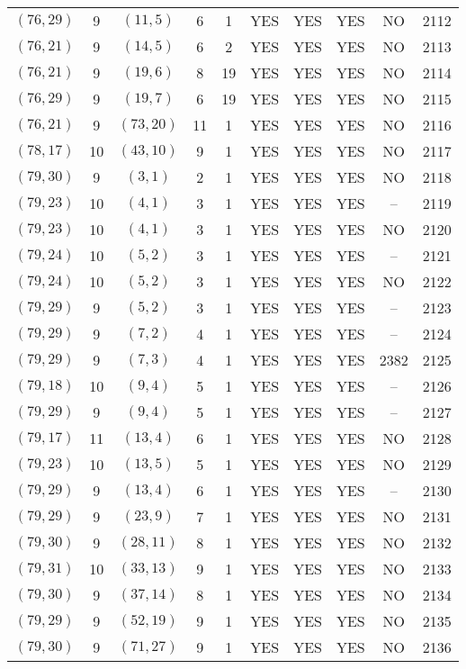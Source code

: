 \begin{longtable}{|c|c|c|c|c|c|c|c|c|c|}
$(76, 29)$ & 9 & $(11, 5)$ & 6 & 1 & YES & YES & YES & NO & 2112\\
$(76, 21)$ & 9 & $(14, 5)$ & 6 & 2 & YES & YES & YES & NO & 2113\\
$(76, 21)$ & 9 & $(19, 6)$ & 8 & 19 & YES & YES & YES & NO & 2114\\
$(76, 29)$ & 9 & $(19, 7)$ & 6 & 19 & YES & YES & YES & NO & 2115\\
$(76, 21)$ & 9 & $(73, 20)$ & 11 & 1 & YES & YES & YES & NO & 2116\\
$(78, 17)$ & 10 & $(43, 10)$ & 9 & 1 & YES & YES & YES & NO & 2117\\
$(79, 30)$ & 9 & $(3, 1)$ & 2 & 1 & YES & YES & YES & NO & 2118\\
$(79, 23)$ & 10 & $(4, 1)$ & 3 & 1 & YES & YES & YES & -- & 2119\\
$(79, 23)$ & 10 & $(4, 1)$ & 3 & 1 & YES & YES & YES & NO & 2120\\
$(79, 24)$ & 10 & $(5, 2)$ & 3 & 1 & YES & YES & YES & -- & 2121\\
$(79, 24)$ & 10 & $(5, 2)$ & 3 & 1 & YES & YES & YES & NO & 2122\\
$(79, 29)$ & 9 & $(5, 2)$ & 3 & 1 & YES & YES & YES & -- & 2123\\
$(79, 29)$ & 9 & $(7, 2)$ & 4 & 1 & YES & YES & YES & -- & 2124\\
$(79, 29)$ & 9 & $(7, 3)$ & 4 & 1 & YES & YES & YES & 2382 & 2125\\
$(79, 18)$ & 10 & $(9, 4)$ & 5 & 1 & YES & YES & YES & -- & 2126\\
$(79, 29)$ & 9 & $(9, 4)$ & 5 & 1 & YES & YES & YES & -- & 2127\\
$(79, 17)$ & 11 & $(13, 4)$ & 6 & 1 & YES & YES & YES & NO & 2128\\
$(79, 23)$ & 10 & $(13, 5)$ & 5 & 1 & YES & YES & YES & NO & 2129\\
$(79, 29)$ & 9 & $(13, 4)$ & 6 & 1 & YES & YES & YES & -- & 2130\\
$(79, 29)$ & 9 & $(23, 9)$ & 7 & 1 & YES & YES & YES & NO & 2131\\
$(79, 30)$ & 9 & $(28, 11)$ & 8 & 1 & YES & YES & YES & NO & 2132\\
$(79, 31)$ & 10 & $(33, 13)$ & 9 & 1 & YES & YES & YES & NO & 2133\\
$(79, 30)$ & 9 & $(37, 14)$ & 8 & 1 & YES & YES & YES & NO & 2134\\
$(79, 29)$ & 9 & $(52, 19)$ & 9 & 1 & YES & YES & YES & NO & 2135\\
$(79, 30)$ & 9 & $(71, 27)$ & 9 & 1 & YES & YES & YES & NO & 2136\\

\end{longtable}
